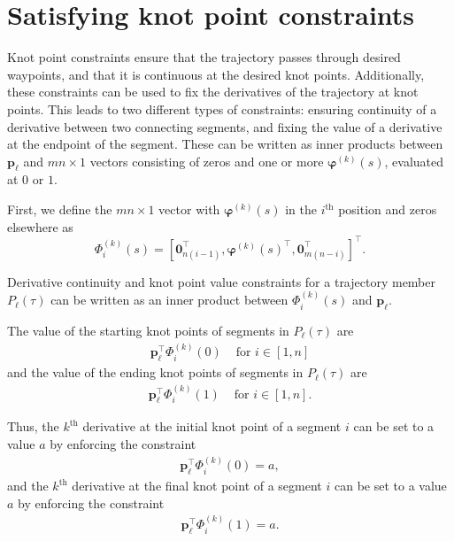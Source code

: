 \section{Satisfying knot point constraints}
\label{sec:knotpoint}
Knot point constraints ensure that the trajectory passes through desired waypoints, and that it is continuous at the desired knot points. 
Additionally, these constraints can be used to fix the derivatives of the trajectory at knot points.
This leads to two different types of constraints:
ensuring continuity of a derivative between two connecting segments, 
and fixing the value of a derivative at the endpoint of the segment. 
These can be written as inner products between $\mathbf{p}_\ell$ and $mn \times 1$ 
vectors consisting of zeros and one or more $\boldsymbol{\varphi}^{(k)}(s)$, evaluated at $0$ or $1$. 

First, we define the $mn \times 1$ vector with $\boldsymbol{\varphi}^{(k)} (s)$ in the $i^\text{th}$ position and zeros elsewhere as
\begin{equation}
	\Phi^{(k)}_{i} (s) = [\mathbf{0}_{n(i-1)}^\top, \boldsymbol{\varphi}^{(k)} (s)^\top, \mathbf{0}_{m(n-i)}^\top]^\top.
\end{equation}

\begin{theorem}
	Derivative continuity and knot point value constraints for a trajectory member $P_\ell(\tau)$ can be written as an inner product between 
	$\Phi^{(k)}_{i} (s)$ and $\mathbf{p}_\ell$.
\end{theorem}

\proof
	The value of the starting knot points of segments in $P_\ell(\tau)$ are
	\begin{align}
		\mathbf{p}_\ell^\top \Phi^{(k)}_i (0) & \text{ for } i \in [1, n]
	\end{align}
	and the value of the ending knot points of segments in $P_\ell(\tau)$ are
	\begin{align}
		\mathbf{p}_\ell^\top \Phi^{(k)}_i (1) & \text{ for } i \in [1, n].
	\end{align}

	Thus, the $k^\text{th}$ derivative at the initial knot point of a segment $i$ can be set to a value $a$ by enforcing the constraint
	\begin{align}
		\mathbf{p}_\ell^\top \Phi^{(k)}_i (0) = a,
	\end{align}
	and the $k^\text{th}$ derivative at the final knot point of a segment $i$ can be set to a value $a$ by enforcing the constraint
	\begin{align}
		\mathbf{p}_\ell^\top \Phi^{(k)}_i (1) = a.
	\end{align}

